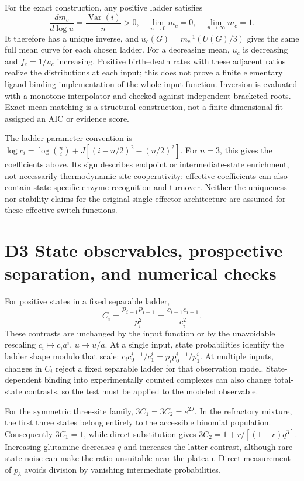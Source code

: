 \documentclass[11pt]{article}
\begin{document}
For the exact construction, any positive ladder satisfies
\[
\frac{d m_c}{d\log u}=\frac{\operatorname{Var}(i)}n>0,\quad
\lim_{u\to0}m_c=0,\quad\lim_{u\to\infty}m_c=1. \tag{S37}
\]
It therefore has a unique inverse, and $u_c(G)=m_c^{-1}(U(G)/3)$ gives the same full mean curve for each chosen ladder. For a decreasing mean, $u_c$ is decreasing and $f_c=1/u_c$ increasing. Positive birth--death rates with these adjacent ratios realize the distributions at each input; this does not prove a finite elementary ligand-binding implementation of the whole input function. Inversion is evaluated with a monotone interpolator and checked against independent bracketed roots. Exact mean matching is a structural construction, not a finite-dimensional fit assigned an AIC or evidence score.

The ladder parameter convention is $\log c_i=\log {n\choose i}+J[(i-n/2)^2-(n/2)^2]$. For $n=3$, this gives the coefficients above. Its sign describes endpoint or intermediate-state enrichment, not necessarily thermodynamic site cooperativity: effective coefficients can also contain state-specific enzyme recognition and turnover. Neither the uniqueness nor stability claims for the original single-effector architecture are assumed for these effective switch functions.

\section*{D3 State observables, prospective separation, and numerical checks}

For positive states in a fixed separable ladder,
\[
C_i=\frac{p_{i-1}p_{i+1}}{p_i^2}=\frac{c_{i-1}c_{i+1}}{c_i^2}. \tag{S40}
\]
These contrasts are unchanged by the input function or by the unavoidable rescaling $c_i\mapsto c_i a^i$, $u\mapsto u/a$. At a single input, state probabilities identify the ladder shape modulo that scale: $c_i c_0^{i-1}/c_1^i=p_i p_0^{i-1}/p_1^i$. At multiple inputs, changes in $C_i$ reject a fixed separable ladder for that observation model. State-dependent binding into experimentally counted complexes can also change total-state contrasts, so the test must be applied to the modeled observable.

For the symmetric three-site family, $3C_1=3C_2=e^{2J}$. In the refractory mixture, the first three states belong entirely to the accessible binomial population. Consequently $3C_1=1$, while direct substitution gives $3C_2=1+r/[(1-r)q^3]$. Increasing glutamine decreases $q$ and increases the latter contrast, although rare-state noise can make the ratio unsuitable near the plateau. Direct measurement of $p_3$ avoids division by vanishing intermediate probabilities.
\end{document}
